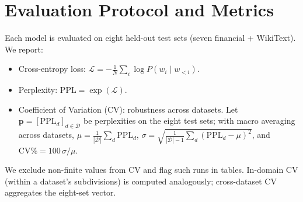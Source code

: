 \section{Evaluation Protocol and Metrics}
Each model is evaluated on eight held-out test sets (seven financial + WikiText). We report:
\begin{itemize}
  \item Cross-entropy loss: $\mathcal{L} = -\frac{1}{N}\sum_i \log P(w_i\mid w_{<i})$.
  \item Perplexity: $\mathrm{PPL} = \exp(\mathcal{L})$.
  \item Coefficient of Variation (CV): robustness across datasets. Let $\mathbf{p} = [\mathrm{PPL}_d]_{d\in\mathcal{D}}$ be perplexities on the eight test sets; with macro averaging across datasets,
  $\mu = \frac{1}{|\mathcal{D}|}\sum_d \mathrm{PPL}_d$, $\sigma = \sqrt{\frac{1}{|\mathcal{D}|-1}\sum_d (\mathrm{PPL}_d - \mu)^2}$, and $\mathrm{CV}\% = 100\,\sigma/\mu$.
\end{itemize}
We exclude non-finite values from CV and flag such runs in tables. In-domain CV (within a dataset’s subdivisions) is computed analogously; cross-dataset CV aggregates the eight-set vector.
